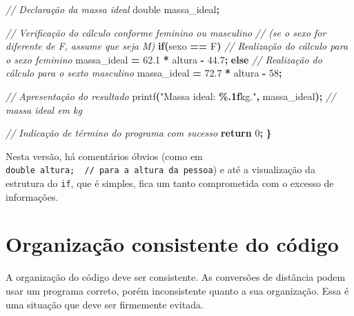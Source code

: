 \documentclass[
  11pt,
  a4paper,
]{scrbook}
\newenvironment{Shaded}{\begin{snugshade}}{\end{snugshade}}
\newcommand{\CharTok}[1]{\textcolor[rgb]{0.31,0.60,0.02}{#1}}
\newcommand{\CommentTok}[1]{\textcolor[rgb]{0.56,0.35,0.01}{\textit{#1}}}
\newcommand{\ControlFlowTok}[1]{\textcolor[rgb]{0.13,0.29,0.53}{\textbf{#1}}}
\newcommand{\DataTypeTok}[1]{\textcolor[rgb]{0.13,0.29,0.53}{#1}}
\newcommand{\DecValTok}[1]{\textcolor[rgb]{0.00,0.00,0.81}{#1}}
\newcommand{\FloatTok}[1]{\textcolor[rgb]{0.00,0.00,0.81}{#1}}
\newcommand{\NormalTok}[1]{#1}
\newcommand{\OperatorTok}[1]{\textcolor[rgb]{0.81,0.36,0.00}{\textbf{#1}}}
\newcommand{\SpecialCharTok}[1]{\textcolor[rgb]{0.81,0.36,0.00}{\textbf{#1}}}
\newcommand{\StringTok}[1]{\textcolor[rgb]{0.31,0.60,0.02}{#1}}
\begin{document}
\begin{tcolorbox}
\begin{Shaded}
\begin{Highlighting}[]
    \CommentTok{// Declaração da massa ideal}
    \DataTypeTok{double}\NormalTok{ massa\_ideal}\OperatorTok{;}

    \CommentTok{// Verificação do cálculo conforme feminino ou masculino}
    \CommentTok{// (se o sexo for diferente de \textquotesingle{}F\textquotesingle{}, assume que seja \textquotesingle{}M\textquotesingle{})}
    \ControlFlowTok{if}\OperatorTok{(}\NormalTok{sexo }\OperatorTok{==} \CharTok{\textquotesingle{}F\textquotesingle{}}\OperatorTok{)}
        \CommentTok{// Realização do cálculo para o sexo feminino}
\NormalTok{        massa\_ideal }\OperatorTok{=} \FloatTok{62.1} \OperatorTok{*}\NormalTok{ altura }\OperatorTok{{-}} \FloatTok{44.7}\OperatorTok{;}
    \ControlFlowTok{else}
        \CommentTok{// Realização do cálculo para o sexto masculino}
\NormalTok{        massa\_ideal }\OperatorTok{=} \FloatTok{72.7} \OperatorTok{*}\NormalTok{ altura }\OperatorTok{{-}} \DecValTok{58}\OperatorTok{;}

    \CommentTok{// Apresentação do resultado}
\NormalTok{    printf}\OperatorTok{(}\StringTok{"Massa ideal: }\SpecialCharTok{\%.1f}\StringTok{kg."}\OperatorTok{,}\NormalTok{ massa\_ideal}\OperatorTok{);}  \CommentTok{// massa ideal em kg}

    \CommentTok{// Indicação de término do programa com sucesso}
    \ControlFlowTok{return} \DecValTok{0}\OperatorTok{;}
\OperatorTok{\}}
\end{Highlighting}
\end{Shaded}

Nesta versão, há comentários óbvios (como em
\texttt{double\ altura;\ \ //\ para\ a\ altura\ da\ pessoa}) e até a
visualização da estrutura do \texttt{if}, que é simples, fica um tanto
comprometida com o excesso de informações.

\end{tcolorbox}

\section{Organização consistente do
código}\label{organizauxe7uxe3o-consistente-do-cuxf3digo}

A organização do código deve ser consistente. As conversões de distância
podem usar um programa correto, porém inconsistente quanto a sua
organização. Essa é uma situação que deve ser firmemente evitada.
\end{document}

